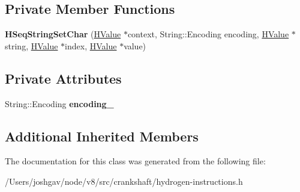 \subsection*{Private Member Functions}
\begin{DoxyCompactItemize}
\item 
{\bfseries H\+Seq\+String\+Set\+Char} (\hyperlink{classv8_1_1internal_1_1_h_value}{H\+Value} $\ast$context, String\+::\+Encoding encoding, \hyperlink{classv8_1_1internal_1_1_h_value}{H\+Value} $\ast$string, \hyperlink{classv8_1_1internal_1_1_h_value}{H\+Value} $\ast$index, \hyperlink{classv8_1_1internal_1_1_h_value}{H\+Value} $\ast$value)\hypertarget{classv8_1_1internal_1_1_h_seq_string_set_char_aaa1402c7ea1dffafde569f9aff989961}{}\label{classv8_1_1internal_1_1_h_seq_string_set_char_aaa1402c7ea1dffafde569f9aff989961}

\end{DoxyCompactItemize}
\subsection*{Private Attributes}
\begin{DoxyCompactItemize}
\item 
String\+::\+Encoding {\bfseries encoding\+\_\+}\hypertarget{classv8_1_1internal_1_1_h_seq_string_set_char_a237156a59cf3ae448baab832a93dfd4b}{}\label{classv8_1_1internal_1_1_h_seq_string_set_char_a237156a59cf3ae448baab832a93dfd4b}

\end{DoxyCompactItemize}
\subsection*{Additional Inherited Members}


The documentation for this class was generated from the following file\+:\begin{DoxyCompactItemize}
\item 
/\+Users/joshgav/node/v8/src/crankshaft/hydrogen-\/instructions.\+h\end{DoxyCompactItemize}
